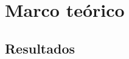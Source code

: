 
\chapter{Marco teórico}

\ifpdf
    \graphicspath{{Chapter4/Figs/}{Chapter4/Figs/PDF/}{Chapter4/Figs/}}
\else
    \graphicspath{{Chapter4/Figs/}{Chapter4/Figs/}}
\fi


\section{Resultados}

\subsection{}

